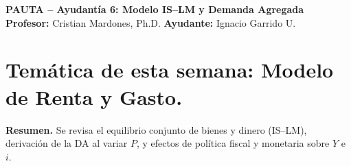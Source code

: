 \documentclass[11pt,addpoints]{article}
\begin{document}
\vspace*{0.01cm}

\begin{center}
{\Large \bfseries PAUTA -- Ayudantía 6: Modelo IS--LM y Demanda Agregada \\[0.5cm]}
\textbf{Profesor:} Cristian Mardones, Ph.D. \quad \textbf{Ayudante:} Ignacio Garrido U.
\end{center}

\section*{\textbf{Temática de esta semana: Modelo de Renta y Gasto.}}
\textbf{Resumen.} Se revisa el equilibrio conjunto de bienes y dinero (IS--LM), derivación de la DA al variar \(P\), y efectos de política fiscal y monetaria sobre \(Y\) e \(i\).
\end{document}
